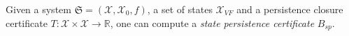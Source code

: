\documentclass[acmlarge]{acmart}
\begin{document}

\begin{theorem}[EXPRESSIVENESS] 
\label{expresss123}
  Given a system $\mathfrak{S}=(\mathcal{X}, \mathcal{X}_0, f)$, a set of states $\mathcal{X}_{VF}$ and a persistence closure certificate $T:\mathcal{X} \times \mathcal{X} \rightarrow \mathbb{R}$, one can compute a \emph{state persistence certificate} $B_{sp}$.
\end{theorem}
\end{document}
